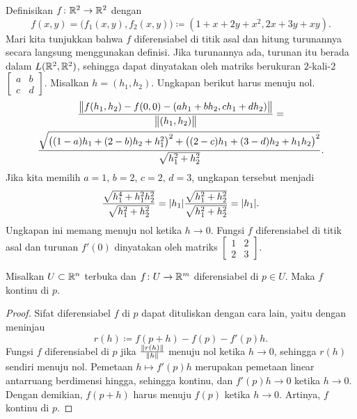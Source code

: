 \begin{example}
Definisikan $f \colon {\mathbb{R}}^2 \to {\mathbb{R}}^2$ dengan
\begin{equation*}
f(x,y) = \bigl(f_1(x,y),f_2(x,y)\bigr) \coloneqq (1+x+2y+x^2,2x+3y+xy).
\end{equation*}
Mari kita tunjukkan bahwa $f$ diferensiabel di titik asal dan
hitung turunannya secara langsung menggunakan definisi.
Jika turunannya ada, turunan itu berada dalam $L({\mathbb{R}}^2,{\mathbb{R}}^2)$, sehingga dapat
dinyatakan oleh matriks berukuran $2$-kali-$2$
$\left[\begin{smallmatrix}a&b\\c&d\end{smallmatrix}\right]$.  Misalkan $h =
(h_1,h_2)$.  Ungkapan berikut harus menuju nol.
\begin{multline*}
\frac{\bigl\lVert {
f(h_1,h_2)-f(0,0)
-
(ah_1 +bh_2 , ch_1+dh_2)} \bigr\rVert
}{\bigl\lVert {(h_1,h_2)} \bigr\rVert}
=
\\
\frac{\sqrt{
{\bigl((1-a)h_1 + (2-b)h_2 + h_1^2\bigr)}^2
+
{\bigl((2-c)h_1 + (3-d)h_2 + h_1h_2\bigr)}^2}}{\sqrt{h_1^2+h_2^2}} .
\end{multline*}
Jika kita memilih $a=1$, $b=2$, $c=2$, $d=3$, ungkapan tersebut menjadi
\begin{equation*}
\frac{\sqrt{
h_1^4 + h_1^2h_2^2}}{\sqrt{h_1^2+h_2^2}}
=
\lvert {h_1} \rvert
\frac{\sqrt{
h_1^2 + h_2^2}}{\sqrt{h_1^2+h_2^2}}
= \lvert {h_1} \rvert .
\end{equation*}
Ungkapan ini memang menuju nol ketika $h \to 0$.  Fungsi
$f$ diferensiabel di titik asal dan
turunan $f'(0)$ dinyatakan oleh matriks
$\left[\begin{smallmatrix}1&2\\2&3\end{smallmatrix}\right]$.
\end{example}

\begin{prop}
Misalkan $U \subset {\mathbb{R}}^n$ terbuka dan $f \colon U \to {\mathbb{R}}^m$
diferensiabel di $p \in U$.  Maka $f$ kontinu di $p$.
\end{prop}

\begin{proof}
Sifat diferensiabel $f$ di $p$ dapat dituliskan dengan cara lain, yaitu dengan meninjau
\begin{equation*}
r(h) \coloneqq f(p+h)-f(p) - f'(p) h .
\end{equation*}
Fungsi $f$ diferensiabel di $p$ jika
$\frac{\lVert {r(h)} \rVert}{\lVert {h} \rVert}$ menuju nol ketika $h \to 0$,
sehingga
$r(h)$ sendiri menuju nol.  Pemetaan $h \mapsto f'(p) h$
merupakan pemetaan linear antarruang berdimensi hingga, sehingga kontinu,
dan $f'(p) h \to 0$ ketika $h \to 0$.  Dengan demikian,
$f(p+h)$ harus menuju $f(p)$ ketika $h \to 0$.  Artinya, $f$ kontinu di $p$.
\end{proof}

